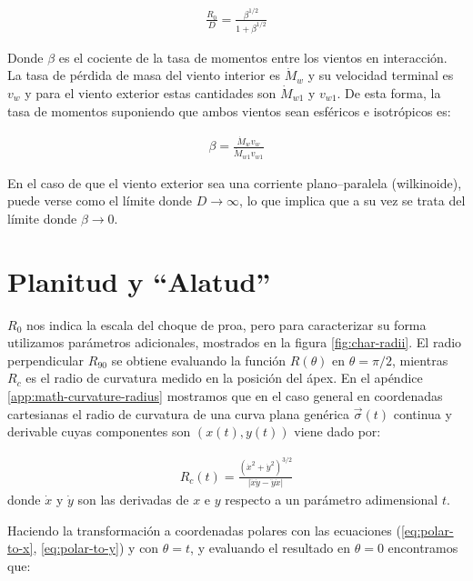 \begin{align}
  \frac{R_0}{D} = \frac{\beta^{1/2}}{1 + \beta^{1/2}}
\end{align}

Donde $\beta$ es el cociente de la tasa de momentos entre los vientos en interacción. La tasa de pérdida de masa del viento interior es $\dot{M}_w$ y su velocidad terminal es $v_w$ y para el viento exterior estas cantidades son $\dot{M}_{w1}$ y $v_{w1}$. De esta forma, la tasa de momentos suponiendo que ambos vientos sean esféricos e isotrópicos es:

\begin{align}
  \beta = \frac{\dot{M}_w v_w}{\dot{M}_{w1} v_{w1}} \label{eq:beta-def}
\end{align}

En el caso de que el viento exterior sea una corriente plano--paralela (wilkinoide), puede verse como el límite donde $D\to\infty$, lo que implica que a su vez se trata del límite donde $\beta\to 0$.


\section{Planitud y ``Alatud''}
\label{sec:char-rad}

$R_0$ nos indica la escala del choque de proa, pero para caracterizar su forma utilizamos parámetros adicionales, mostrados en la figura \ref{fig:char-radii}. El radio perpendicular $R_{90}$ se obtiene evaluando la función $R(\theta)$ en $\theta=\pi/2$, mientras $R_c$ es el radio de curvatura medido en la posición del ápex. En el apéndice \ref{app:math-curvature-radius} mostramos que en el caso general en coordenadas cartesianas el radio de curvatura de una curva plana genérica $\vec{\sigma}(t)$ continua y derivable cuyas componentes son $(x(t), y(t))$ viene dado por:%

\begin{align}
  R_c(t) = \frac{\left(\dot{x}^2 + \dot{y}^2\right)^{3/2}}{\left|\ddot{x}\dot{y} - \ddot{y}\dot{x}\right|} \label{eq:Rc-general-xy} 
\end{align}
donde $\dot{x}$ y $\dot{y}$ son las derivadas de $x$ e $y$ respecto a un parámetro adimensional $t$.

Haciendo la transformación a coordenadas polares con las ecuaciones (\ref{eq:polar-to-x}, \ref{eq:polar-to-y}) y con $\theta=t$, y evaluando el resultado en $\theta=0$ encontramos que:

